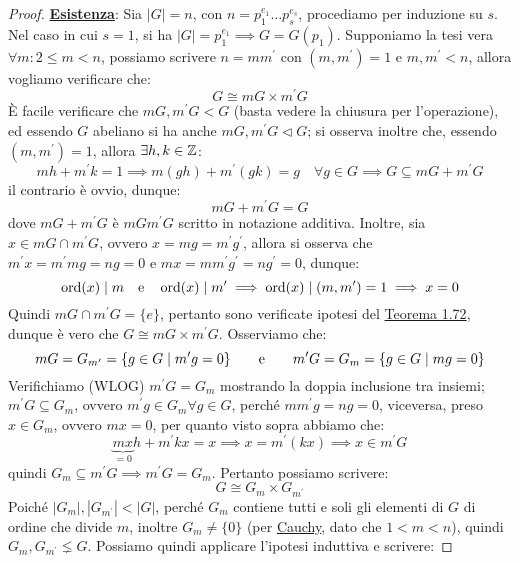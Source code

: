 \documentclass[11pt]{scrartcl}
\begin{document}
\begin{proof}
    \underline{\textbf{Esistenza}}: Sia $|G| = n$, con $n = p_1^{e_1} \ldots p_s^{e_s}$, procediamo per induzione su $s$. Nel caso in cui $s = 1$, si ha $|G| = p_1^{e_1} \implies G = G(p_1)$. Supponiamo 
    la tesi vera $\forall m : 2 \leq m < n$, possiamo scrivere $n = m m^{\prime}$ con $(m,m^{\prime}) = 1$ e $m,m^{\prime} < n$, allora vogliamo verificare che:
        \[ G \cong mG \times m^{\prime}G
            \]
        È facile verificare che $mG,m^{\prime}G < G$ (basta vedere la chiusura per l'operazione), ed essendo $G$ abeliano si ha anche $mG, m^{\prime}G \triangleleft G$; si osserva inoltre che, essendo $(m,m^{\prime}) = 1$, allora $\exists h,k \in \mathbb Z$:
            \[ mh + m^{\prime}k = 1 \implies m(gh) + m^{\prime}(gk) = g \quad \forall g \in G \implies G \subseteq mG + m^{\prime}G
                \]
        il contrario è ovvio, dunque:
            \[ mG + m^{\prime}G = G
                \]
	dove $mG + m^{\prime}G$ è $mGm^{\prime}G$ scritto in notazione additiva.
        Inoltre, sia $x \in mG \cap m^{\prime}G$, ovvero $x = mg = m^{\prime}g^{\prime}$, allora si osserva che $m^{\prime}x = m^{\prime}mg = ng = 0$ e $mx = mm^{\prime}g^{\prime} = ng^{\prime} = 0$, dunque:
            \[ \operatorname{ord}(x) \mid m \quad \text e \quad \operatorname{ord}(x) \mid m^{\prime} \implies \operatorname{ord}(x) \mid (m,m^{\prime}) = 1 \implies x = 0
                \]
        Quindi $mG \cap m^{\prime}G = \{e\}$, pertanto sono verificate ipotesi del \hyperref[t:1.72]{Teorema 1.72}, dunque è vero che $G \cong mG \times m^{\prime}G$. Osserviamo che:
            \[ mG = G_{m^{\prime}} = \{g \in G \mid m^{\prime}g = 0\} \qquad \text e \qquad m^{\prime}G = G_m = \{g \in G \mid mg = 0\}
                \]
        Verifichiamo (WLOG) $m^{\prime}G = G_m$ mostrando la doppia inclusione tra insiemi; 
	$m^{\prime}G \subseteq G_m$, ovvero $m^{\prime}g \in G_m \forall g \in G$, perché $mm^{\prime}g = ng = 0$, viceversa, preso 
        $x \in G_m$, ovvero $mx = 0$, per quanto visto sopra abbiamo che:
            \[ \underbrace{mx}_{= 0}h + m^{\prime}kx = x \implies x = m^{\prime}(kx) \implies x \in m^{\prime}G
                \]
        quindi $G_m \subseteq m^{\prime}G \implies m^{\prime}G = G_m$. Pertanto possiamo scrivere:
            \[ G \cong G_m \times G_{m^\prime}
                \]
        Poiché $|G_m|,|G_{m^\prime}| < |G|$, perché $G_m$ contiene tutti e soli gli elementi di $G$ di ordine che divide $m$, inoltre $G_m \ne \{0\}$ (per \hyperref[p:Cauchy]{Cauchy}, dato che $1 < m < n$),
        quindi $G_m, G_{m^\prime} \lneq G$. Possiamo quindi applicare l'ipotesi induttiva e scrivere:

\end{proof}
\end{document}
